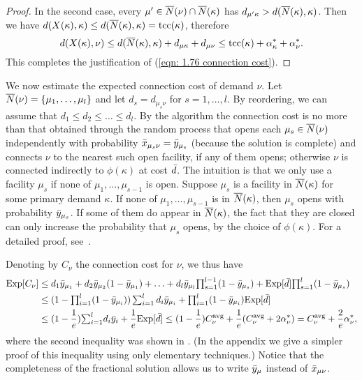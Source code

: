 \documentclass[11pt]{article}
\begin{document}
\begin{proof}
 In the second case, every $\mu'\in
{\overline{N}}(\nu)\cap {\overline{N}}(\kappa)$ has $d_{\mu'\kappa} >
d({\overline{N}}(\kappa),\kappa)$. Then we have
$d(X(\kappa),\kappa)\leq
d({\overline{N}}(\kappa),\kappa)=\textrm{tcc}(\kappa)$, therefore
\begin{equation*}
  d(X(\kappa), \nu) \leq d({\overline{N}}(\kappa), \kappa) +
  d_{\mu\kappa} + d_{\mu\nu} \leq \textrm{tcc}(\kappa) +
  \alpha_{\kappa}^\ast + \alpha_{\nu}^\ast.  
\end{equation*}
This completes the justification of (\ref{eqn: 1.76
  connection cost}).
\end{proof}

We now estimate the expected connection cost of demand
$\nu$. Let ${\overline{N}}(\nu) = { \left\{ \mu_1,\ldots,\mu_l \right\} }$ and
let $d_s = d_{\mu_s\nu}$ for $s = 1,\ldots,l$. By
reordering, we can assume that $d_1 \le d_2 \le \ldots \le
d_l$. By the algorithm the connection cost is no more than
that obtained through the random process that opens each
$\mu_s\in {\overline{N}}(\nu)$ independently with probability
${\bar x}_{\mu_s \nu} ={\bar y}_{\mu_s}$ (because the solution is
complete) and connects $\nu$ to the nearest such open
facility, if any of them opens; otherwise $\nu$ is connected
indirectly to $\phi(\kappa)$ at cost ${\bar d}$. The intuition
is that we only use a facility $\mu_s$ if none of
$\mu_1,\ldots,\mu_{s-1}$ is open. Suppose $\mu_s$ is a
facility in ${\overline{N}}(\kappa)$ for some primary demand
$\kappa$. If none of $\mu_1,\ldots,\mu_{s-1}$ is in
${\overline{N}}(\kappa)$, then $\mu_s$ opens with probability
${\bar y}_{\mu_s}$. If some of them do appear in
${\overline{N}}(\kappa)$, the fact that they are closed can only
increase the probability that $\mu_s$ opens, by the choice
of $\phi(\kappa)$.  For a detailed proof,
see~\cite{ChudakS04}.

Denoting by $C_\nu$ the connection cost for $\nu$, we thus have
%
\begin{align*}
  \mbox{\rm Exp}[C_\nu] &\leq d_1 {\bar y}_{\mu_1} + d_2 {\bar y}_{\mu_2}(1-{\bar y}_{\mu_1}) + \ldots
 		+  d_l {\bar y}_{\mu_l}\textstyle{\prod_{s=1}^{l-1}}(1-{\bar y}_{\mu_s}) 
		+  \mbox{\rm Exp}[{\bar d}]\textstyle{\prod_{s=1}^{l}} (1-{\bar y}_{\mu_s})
		\\
  &\leq (1-\textstyle{\prod_{i=1}^l} (1-{\bar y}_{\mu_i}))
  	\sum_{i=1}^l d_i{\bar y}_{\mu_i} + {\textstyle\prod_{i=1}^l} (1-\bar  y_{\mu_i})\mbox{\rm Exp}[{\bar d}]
	\\
  &\leq (1-\frac{1}{e}) {\textstyle\sum_{i=1}^l} d_i{\bar y}_i 
	+ \frac{1}{e} \mbox{\rm Exp}[{\bar d}] \leq (1-\frac{1}{e}) C^{{\mbox{\scriptsize\rm avg}}}_{\nu} 
	+	\frac{1}{e}	(C^{{\mbox{\scriptsize\rm avg}}}_{\nu} + 2\alpha_{\nu}^\ast) = C^{{\mbox{\scriptsize\rm avg}}}_{\nu} + \frac{2}{e}\alpha_{\nu}^\ast,
\end{align*}
%
where the second inequality was shown in
\cite{ChudakS04}. (In the appendix we give a simpler
proof of this inequality using only elementary techniques.)  Notice that the
completeness of the fractional solution allows us to write
${\bar y}_{\mu}$ instead of ${\bar x}_{\mu\nu}$.
\end{document}
